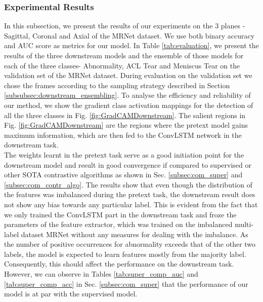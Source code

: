 \documentclass[journal]{IEEEtai}
\begin{document}
\subsubsection{Experimental Results}
\label{subsubsec:down_exp_res}

In this subsection, we present the results of our experiments on the 3 planes - Sagittal, Coronal and Axial of the MRNet dataset. We use both binary accuracy and AUC score as metrics for our model. In Table \ref{tab:evaluation}, we present the results of the three downstream models and the ensemble of those models for each of the three classes- Abnormality, ACL Tear and Meniscus Tear on the validation set of the MRNet dataset. During evaluation on the validation set we chose the frames according to the sampling strategy described in Section \ref{subsubsec:downstream_ensembling}. To analyse the efficiency and reliability of our method, we show the gradient class activation mappings \cite{gradcam} for the detection of all the three classes in Fig. \ref{fig:GradCAMDownstream}. The salient regions in Fig. \ref{fig:GradCAMDownstream} are the regions where the pretext model gains maximum information, which are then fed to the ConvLSTM network in the downstream task.\\
\indent
The weights learnt in the pretext task serve as a good initiation point for the downstream model and result in good convergence if compared to supervised or other SOTA contrastive algorithms as shown in Sec. \ref{subsec:com_super} and \ref{subsec:com_contr_algo}. The results show that even though the distribution of the features was imbalanced during the pretext task, the downstream result does not show any bias towards any particular label. This is evident from the fact that we only trained the ConvLSTM part in the downstream task and froze the parameters of the feature extractor, which was trained on the imbalanced multi-label dataset MRNet without any measures for dealing with the imbalance. As the number of positive occurrences for abnormality exceeds that of the other two labels, the model is expected to learn features mostly from the majority label. Consequently, this should affect the performance on the downstream task. However, we can observe in Tables \ref{tab:super_comp_auc} and \ref{tab:super_comp_acc} in Sec. \ref{subsec:com_super} that the performance of our model is at par with the supervised model.
\end{document}
